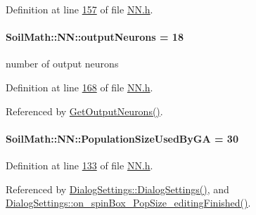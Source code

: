 Definition at line \hyperlink{_n_n_8h_source_l00157}{157} of file \hyperlink{_n_n_8h_source}{N\+N.\+h}.

\hypertarget{class_soil_math_1_1_n_n_a65ce6c65168fbe7051c25dccf4bf2b0c}{}
\paragraph[{output\+Neurons}]{ Soil\+Math\+::\+N\+N\+::output\+Neurons = 18\hspace{0.3cm}{\ttfamily [private]}}\label{class_soil_math_1_1_n_n_a65ce6c65168fbe7051c25dccf4bf2b0c}
number of output neurons 

Definition at line \hyperlink{_n_n_8h_source_l00168}{168} of file \hyperlink{_n_n_8h_source}{N\+N.\+h}.



Referenced by \hyperlink{_n_n_8h_source_l00146}{Get\+Output\+Neurons()}.

\hypertarget{class_soil_math_1_1_n_n_ac6acaf7e9572edbee9c0179ccd584b6f}{}
\paragraph[{Population\+Size\+Used\+By\+G\+A}]{ Soil\+Math\+::\+N\+N\+::\+Population\+Size\+Used\+By\+G\+A = 30}\label{class_soil_math_1_1_n_n_ac6acaf7e9572edbee9c0179ccd584b6f}


Definition at line \hyperlink{_n_n_8h_source_l00133}{133} of file \hyperlink{_n_n_8h_source}{N\+N.\+h}.



Referenced by \hyperlink{dialogsettings_8cpp_source_l00005}{Dialog\+Settings\+::\+Dialog\+Settings()}, and \hyperlink{dialogsettings_8cpp_source_l00425}{Dialog\+Settings\+::on\+\_\+spin\+Box\+\_\+\+Pop\+Size\+\_\+editing\+Finished()}.

\hypertarget{class_soil_math_1_1_n_n_aed36297c9221a837fee94f4774b614bf}{}
